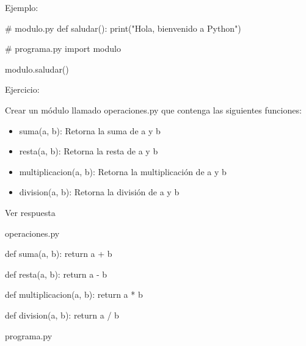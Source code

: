 \documentclass[
  a4paper,
  DIV=11,
  numbers=noendperiod,
  onepage,
  openany]{scrreprt}
\newenvironment{Shaded}{\begin{snugshade}}{\end{snugshade}}
\newcommand{\BuiltInTok}[1]{\textcolor[rgb]{0.00,0.23,0.31}{#1}}
\newcommand{\CommentTok}[1]{\textcolor[rgb]{0.37,0.37,0.37}{#1}}
\newcommand{\ControlFlowTok}[1]{\textcolor[rgb]{0.00,0.23,0.31}{#1}}
\newcommand{\ImportTok}[1]{\textcolor[rgb]{0.00,0.46,0.62}{#1}}
\newcommand{\KeywordTok}[1]{\textcolor[rgb]{0.00,0.23,0.31}{#1}}
\newcommand{\NormalTok}[1]{\textcolor[rgb]{0.00,0.23,0.31}{#1}}
\newcommand{\OperatorTok}[1]{\textcolor[rgb]{0.37,0.37,0.37}{#1}}
\newcommand{\StringTok}[1]{\textcolor[rgb]{0.13,0.47,0.30}{#1}}
\providecommand{\tightlist}{%
  \setlength{\itemsep}{0pt}\setlength{\parskip}{0pt}}\usepackage{longtable,booktabs,array}
\begin{document}
Ejemplo:

\begin{Shaded}
\begin{Highlighting}[]
\CommentTok{\# modulo.py}
\KeywordTok{def}\NormalTok{ saludar():}
    \BuiltInTok{print}\NormalTok{(}\StringTok{"Hola, bienvenido a Python"}\NormalTok{)}
\end{Highlighting}
\end{Shaded}

\begin{Shaded}
\begin{Highlighting}[]
\CommentTok{\# programa.py}
\ImportTok{import}\NormalTok{ modulo}

\NormalTok{modulo.saludar()}
\end{Highlighting}
\end{Shaded}

Ejercicio:

Crear un módulo llamado operaciones.py que contenga las siguientes
funciones:

\begin{itemize}
\tightlist
\item
  suma(a, b): Retorna la suma de a y b
\item
  resta(a, b): Retorna la resta de a y b
\item
  multiplicacion(a, b): Retorna la multiplicación de a y b
\item
  division(a, b): Retorna la división de a y b
\end{itemize}

Ver respuesta

operaciones.py

\begin{Shaded}
\begin{Highlighting}[]
\KeywordTok{def}\NormalTok{ suma(a, b):}
    \ControlFlowTok{return}\NormalTok{ a }\OperatorTok{+}\NormalTok{ b}

\KeywordTok{def}\NormalTok{ resta(a, b):}
    \ControlFlowTok{return}\NormalTok{ a }\OperatorTok{{-}}\NormalTok{ b}

\KeywordTok{def}\NormalTok{ multiplicacion(a, b):}
    \ControlFlowTok{return}\NormalTok{ a }\OperatorTok{*}\NormalTok{ b}

\KeywordTok{def}\NormalTok{ division(a, b):}
    \ControlFlowTok{return}\NormalTok{ a }\OperatorTok{/}\NormalTok{ b}
\end{Highlighting}
\end{Shaded}

programa.py
\end{document}
